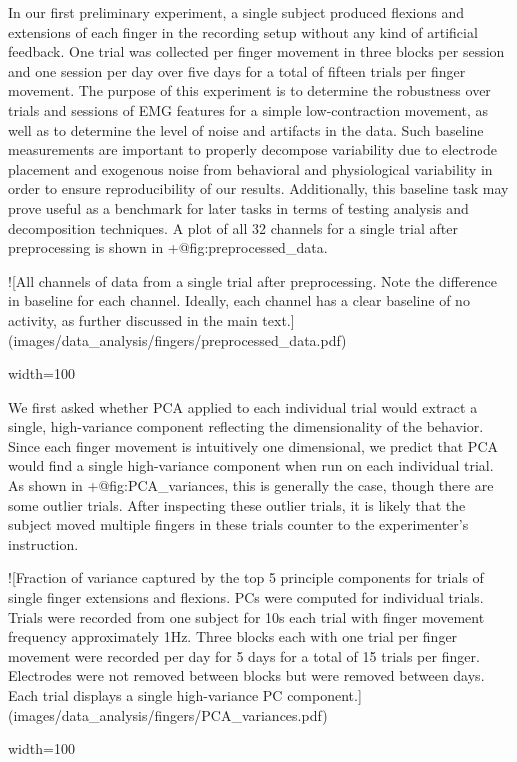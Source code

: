 \documentclass[../main.tex]{subfiles}
\begin{document}
{{{In our first preliminary experiment, a single subject produced flexions and extensions of each finger in the recording setup without any kind of artificial feedback. One trial was collected per finger movement in three blocks per session and one session per day over five days for a total of fifteen trials per finger movement. The purpose of this experiment is to determine the robustness over trials and sessions of EMG features for a simple low-contraction movement, as well as to determine the level of noise and artifacts in the data. Such baseline measurements are important to properly decompose variability due to electrode placement and exogenous noise from behavioral and physiological variability in order to ensure reproducibility of our results. Additionally, this baseline task may prove useful as a benchmark for later tasks in terms of testing analysis and decomposition techniques. A plot of all 32 channels for a single trial after preprocessing is shown in {+@fig:preprocessed_data}.

![All channels of data from a single trial after preprocessing. Note the difference in baseline for each channel. Ideally, each channel has a clear baseline of no activity, as further discussed in the main text.](images/data_analysis/fingers/preprocessed_data.pdf){width=100%

We first asked whether PCA applied to each individual trial would extract a single, high-variance component reflecting the dimensionality of the behavior. Since each finger movement is intuitively one dimensional, we predict that PCA would find a single high-variance component when run on each individual trial. As shown in {+@fig:PCA_variances}, this is generally the case, though there are some outlier trials. After inspecting these outlier trials, it is likely that the subject moved multiple fingers in these trials counter to the experimenter's instruction.

![Fraction of variance captured by the top 5 principle components for trials of single finger extensions and flexions. PCs were computed for individual trials. Trials were recorded from one subject for 10s each trial with finger movement frequency approximately 1Hz. Three blocks each with one trial per finger movement were recorded per day for 5 days for a total of 15 trials per finger. Electrodes were not removed between blocks but were removed between days. Each trial displays a single high-variance PC component.](images/data_analysis/fingers/PCA_variances.pdf){width=100%

}}}}}
\end{document}
